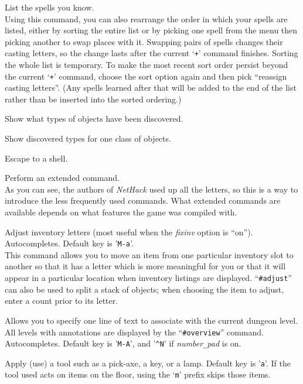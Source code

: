 \item[\tb{+}]
List the spells you know.\\
Using this command, you can also rearrange
the order in which your spells are listed, either by sorting the entire
list or by picking one spell from the menu then picking another to swap
places with it.  Swapping pairs of spells changes their casting letters,
so the change lasts after the current `{\tt +}' command finishes.  Sorting
the whole list is temporary.  To make the most recent sort order persist
beyond the current `{\tt +}' command, choose the sort option again and then
pick ``reassign casting letters''.  (Any spells learned after that will
be added to the end of the list rather than be inserted into the sorted
ordering.)
\item[\tb{$\backslash$}]
Show what types of objects have been discovered.
\item[\tb{\`}]
Show discovered types for one class of objects.
\item[\tb{!}]
Escape to a shell.
\item[\tb{\#}]
Perform an extended command.\\
As you can see, the authors of {\it NetHack\/}
used up all the letters, so this is a way to introduce the less frequently
used commands.
What extended commands are available depends on what features
the game was compiled with.
\item[\tb{\#adjust}]
Adjust inventory letters (most useful when the
{\it fixinv\/}
option is ``on''). Autocompletes. Default key is '{\tt M-a}'.\\
This command allows you to move an item from one particular inventory
slot to another so that it has a letter which is more meaningful for you
or that it will appear in a particular location when inventory listings
are displayed.
``{\tt \#adjust}'' can also be used to split a stack of objects; when
choosing the item to adjust, enter a count prior to its letter.
\item[\tb{\#annotate}]
Allows you to specify one line of text to associate with the current
dungeon level.  All levels with annotations are displayed by the
``{\tt \#overview}'' command. Autocompletes. Default key is '{\tt M-A}',
and '{\tt \^{}N}' if {\it number\verb+_+pad\/} is on.
\item[\tb{\#apply}]
Apply (use) a tool such as a pick-axe, a key, or a lamp.
Default key is '{\tt a}'.
If the tool used acts on items on the floor, using the `{\tt m}' prefix
skips those items.
